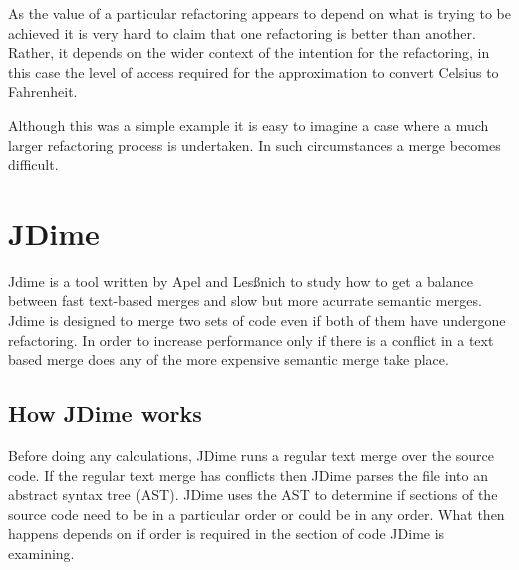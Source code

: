 As the value of a particular refactoring appears to depend on what is trying to be achieved it is very hard to claim that one refactoring is better than another. Rather, it depends on the wider context of the intention for the refactoring, in this case the level of access required for the approximation to convert Celsius to Fahrenheit.

Although this was a simple example it is easy to imagine a case where a much larger refactoring process is undertaken. In such circumstances a merge becomes difficult. 

\section{JDime}

Jdime is a tool written by  Apel and Les{\ss}nich \cite{Apel2012} \cite{Apel2011} \cite{LeBenich2012} to study how to get a balance between fast text-based merges and slow but more acurrate semantic merges.  Jdime is designed to merge two sets of code even if both of them have undergone refactoring. In order to increase performance only if there is a conflict in a text based merge does any of the more expensive semantic merge take place. 

\subsection{How JDime works}

Before doing any calculations, JDime runs a regular text merge over the source code.  
If the regular text merge has conflicts then JDime parses the file into an abstract syntax tree (AST).  JDime uses the AST to determine if sections of the source code need to be in a particular order or could be in any order.
What then happens depends on if order is required in the section of code JDime is examining.


